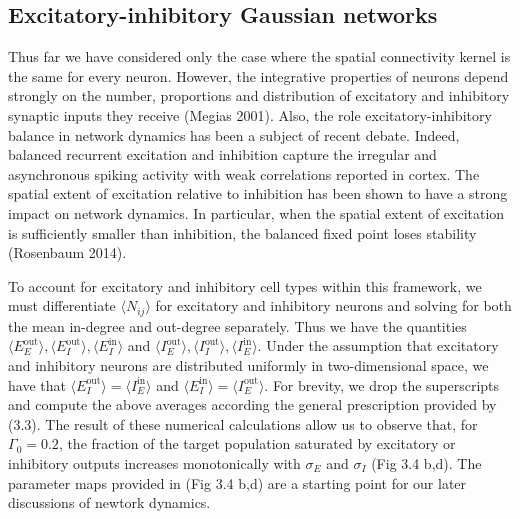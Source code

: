 \documentclass{ucetd}
\begin{document}
\clearpage



\subsection{Excitatory-inhibitory Gaussian networks}

Thus far we have considered only the case where the spatial connectivity kernel is the same for every neuron. However, the integrative properties of neurons depend strongly on the number, proportions and distribution of excitatory and inhibitory synaptic inputs they receive (Megias 2001). Also, the role excitatory-inhibitory balance in network dynamics has been a subject of recent debate. Indeed, balanced recurrent excitation and inhibition capture the irregular and asynchronous spiking activity with weak correlations reported in cortex. The spatial extent of excitation relative to inhibition has been shown to have a strong impact on network dynamics. In particular, when the spatial extent of excitation is sufficiently smaller than inhibition, the balanced fixed point loses stability (Rosenbaum 2014). 

To account for excitatory and inhibitory cell types within this framework, we must differentiate $\langle N_{ij}\rangle$ for excitatory and inhibitory neurons and solving for both the mean in-degree and out-degree separately. Thus we have the quantities $\langle E_{E}^{\mathrm{out}} \rangle,\langle E_{I}^{\mathrm{out}} \rangle,\langle E_{I}^{\mathrm{in}} \rangle$ and $\langle I_{E}^{\mathrm{out}} \rangle,\langle I_{I}^{\mathrm{out}} \rangle,\langle I_{E}^{\mathrm{in}} \rangle$. Under the assumption that excitatory and inhibitory neurons are distributed uniformly  in two-dimensional space, we have that $\langle E_{I}^{\mathrm{out}} \rangle = \langle I_{E}^{\mathrm{in}} \rangle$ and $\langle E_{I}^{\mathrm{in}} \rangle = \langle I_{E}^{\mathrm{out}}\rangle$. For brevity, we drop the superscripts and compute the above averages according the general prescription provided by (3.3). The result of these numerical calculations allow us to observe that, for $\Gamma_{0} = 0.2$, the fraction of the target population saturated by excitatory or inhibitory outputs increases monotonically with $\sigma_{E}$ and $\sigma_{I}$  (Fig 3.4 b,d). The parameter maps provided in (Fig 3.4 b,d) are a starting point for our later discussions of newtork dynamics. 
\end{document}
